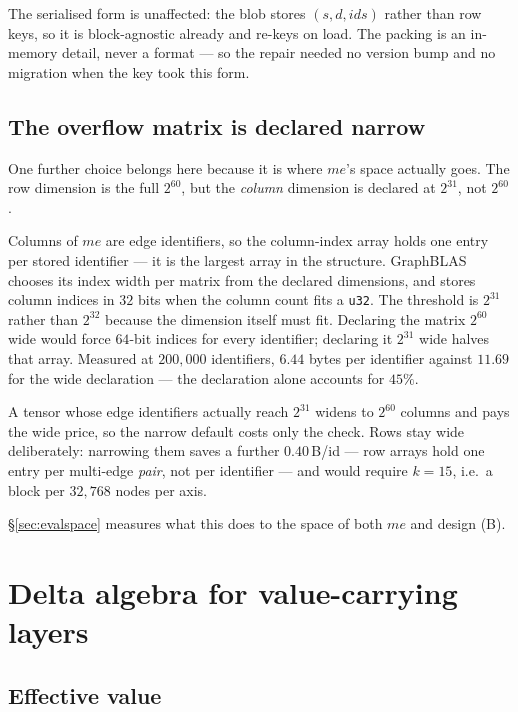 \documentclass[11pt,a4paper]{article}
\theoremstyle{plain}
\theoremstyle{definition}
\theoremstyle{remark}
\begin{document}
The serialised form is unaffected: the blob stores $(s, d, \textit{ids})$ rather
than row keys, so it is block-agnostic already and re-keys on load. The packing
is an in-memory detail, never a format --- so the repair needed no version bump
and no migration when the key took this form.

\subsection{The overflow matrix is declared narrow}
\label{sec:narrow}

One further choice belongs here because it is where $me$'s space actually goes.
The row dimension is the full $2^{60}$, but the \emph{column} dimension is
declared at $2^{31}$, not $2^{60}$.

Columns of $me$ are edge identifiers, so the column-index array holds one entry
per stored identifier --- it is the largest array in the structure. GraphBLAS
chooses its index width per matrix from the declared dimensions, and stores
column indices in $32$ bits when the column count fits a \texttt{u32}. The
threshold is $2^{31}$ rather than $2^{32}$ because the dimension itself must
fit. Declaring the matrix $2^{60}$ wide would force $64$-bit indices for every
identifier; declaring it $2^{31}$ wide halves that array. Measured at $200{,}000$
identifiers, $6.44$ bytes per identifier against $11.69$ for the wide
declaration --- the declaration alone accounts for $45\%$.

A tensor whose edge identifiers actually reach $2^{31}$ widens to $2^{60}$
columns and pays the wide price, so the narrow default costs only the check.
Rows stay wide
deliberately: narrowing them saves a further $0.40$\,B/id --- row arrays hold
one entry per multi-edge \emph{pair}, not per identifier --- and would require
$k = 15$, i.e.\ a block per $32{,}768$ nodes per axis.

\S\ref{sec:evalspace} measures what this does to the space of both $me$ and
design (B).

\section{Delta algebra for value-carrying layers}
\label{sec:deltas}

\subsection{Effective value}
\end{document}
